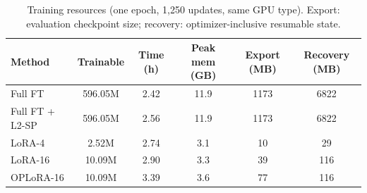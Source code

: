 \begin{table}[t]
\centering
\small
\caption{Training resources (one epoch, 1,250 updates, same GPU type). Export: evaluation checkpoint size; recovery: optimizer-inclusive resumable state.}
\label{tab:t1_res}
\begin{tabular}{lccccc}
\toprule
Method & Trainable & Time (h) & Peak mem (GB) & Export (MB) & Recovery (MB) \\
\midrule
Full FT & 596.05M & 2.42 & 11.9 & 1173 & 6822 \\
Full FT + L2-SP & 596.05M & 2.56 & 11.9 & 1173 & 6822 \\
LoRA-4 & 2.52M & 2.74 & 3.1 & 10 & 29 \\
LoRA-16 & 10.09M & 2.90 & 3.3 & 39 & 116 \\
OPLoRA-16 & 10.09M & 3.39 & 3.6 & 77 & 116 \\
\bottomrule
\end{tabular}
\end{table}
